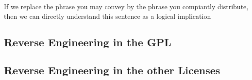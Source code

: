If we replace the phrase you may convey by the phrase you compiantly distribute,
then we can directly understand this sentence as a logical implication


\subsection{Reverse Engineering in the GPL}

\subsection{Reverse Engineering in the other Licenses}













%
